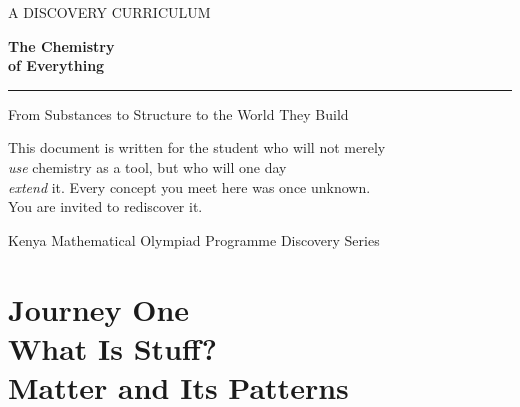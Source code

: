 \documentclass[12pt, a4paper]{book}
\theoremstyle{definition}
\begin{document}
\begin{titlepage}
\pagecolor{JourneyColor}
\color{white}
\centering
\vspace*{3cm}

{\fontsize{11}{13}\selectfont\sffamily\MakeUppercase{A Discovery Curriculum}}

\vspace{0.6cm}
{\fontsize{42}{46}\selectfont\bfseries\sffamily The Chemistry\\[6pt] of Everything}

\vspace{0.8cm}
\textcolor{white!60}{\rule{0.5\textwidth}{1pt}}

\vspace{0.8cm}
{\large\sffamily From Substances to Structure to the World They Build}

\vspace{3cm}

\begin{tcolorbox}[
  enhanced, width=0.75\textwidth,
  colback=white!10, colframe=white!40,
  boxrule=0.8pt, arc=4pt
]
\centering\sffamily\small
This document is written for the student who will not merely\\
\textit{use} chemistry as a tool, but who will one day\\
\textit{extend} it. Every concept you meet here was once unknown.\\
You are invited to rediscover it.
\end{tcolorbox}

\vfill
{\sffamily\small Kenya Mathematical Olympiad Programme \quad\textbullet\quad Discovery Series}
\pagecolor{white}
\end{titlepage}

\tableofcontents
\clearpage

\chapter[Journey 1 — What Is Stuff?]
        {Journey One\\[8pt]\textcolor{ModuleColor}{\large What Is Stuff?\\ Matter and Its Patterns}}
\label{ch:journey1}
\end{document}
